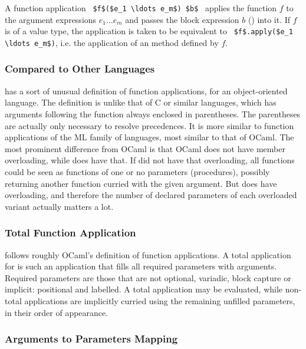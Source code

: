 A function application ~\lstinline!$f$($e_1 \ldots e_m$) $b$!~ applies the function $f$ to the argument expressions $e_1 \ldots e_m$ and passes the block expression $b$ () into it. If $f$ is of a value type, the application is taken to be equivalent to ~\lstinline!$f$.apply($e_1 \ldots e_m$)!, i.e. the application of an  method defined by $f$. 





\subsubsection{Compared to Other Languages}

\Aml has a sort of unusual definition of function applications, for an object-oriented language. The definition is unlike that of C or similar languages, which has arguments following the function always enclosed in parentheses. The parentheses are actually only necessary to resolve precedences. It is more similar to function applications of the ML family of languages, most similar to that of OCaml. The most prominent difference from OCaml is that OCaml does not have member overloading, while \Aml does have that. If \Aml did not have that overloading, all functions could be seen as functions of one or no parameters (procedures), possibly returning another function curried with the given argument. But \Aml does have overloading, and therefore the number of declared parameters of each overloaded variant actually matters a lot. 





\subsubsection{Total Function Application}

\Aml follows roughly OCaml's definition of function applications. A total application for \Aml is such an application that fills all required parameters with arguments. Required parameters are those that are not optional, variadic, block capture or implicit: positional and labelled. A total application may be evaluated, while non-total applications are implicitly curried using the remaining unfilled parameters, in their order of appearance. 







\subsubsection{Arguments to Parameters Mapping}

